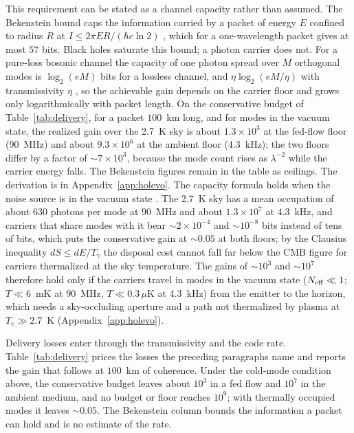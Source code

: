 \documentclass[11pt]{article}
\begin{document}
This requirement can be stated as a channel capacity rather than assumed. The Bekenstein bound caps the information carried by a packet of energy $E$ confined to radius $R$ at $I \leq 2\pi ER/(\hbar c \ln 2)$ \citep{Bekenstein1981}, which for a one-wavelength packet gives at most $57$ bits. Black holes saturate this bound; a photon carrier does not. For a pure-loss bosonic channel the capacity of one photon spread over $M$ orthogonal modes is $\log_2(eM)$ bits for a lossless channel, and $\eta\log_2(eM/\eta)$ with transmissivity $\eta$ \citep{Giovannetti2004}, so the achievable gain depends on the carrier floor and grows only logarithmically with packet length. On the conservative budget of Table~\ref{tab:delivery}, for a packet $100$~km long, and for modes in the vacuum state, the realized gain over the 2.7~K sky is about $1.3\times10^{3}$ at the fed-flow floor (90~MHz) and about $9.3\times10^{6}$ at the ambient floor (4.3~kHz); the two floors differ by a factor of $\sim 7\times10^{3}$, because the mode count rises as $\lambda^{-2}$ while the carrier energy falls. The Bekenstein figures remain in the table as ceilings. The derivation is in Appendix~\ref{app:holevo}. The capacity formula holds when the noise source is in the vacuum state \citep{Giovannetti2004}. The 2.7~K sky has a mean occupation of about $630$ photons per mode at $90$~MHz and about $1.3\times10^{7}$ at $4.3$~kHz, and carriers that share modes with it bear $\sim 2\times10^{-4}$ and $\sim 10^{-8}$ bits instead of tens of bits, which puts the conservative gain at $\sim 0.05$ at both floors; by the Clausius inequality $dS \leq dE/T_\gamma$ the disposal cost cannot fall far below the CMB figure for carriers thermalized at the sky temperature. The gains of $\sim 10^{3}$ and $\sim 10^{7}$ therefore hold only if the carriers travel in modes in the vacuum state ($N_{\rm eff}\ll1$; $T\ll6$~mK at 90~MHz, $T\ll0.3\,\mu$K at 4.3~kHz) from the emitter to the horizon, which needs a sky-occluding aperture and a path not thermalized by plasma at $T_e \gg 2.7$~K (Appendix~\ref{app:holevo}).

Delivery losses enter through the transmissivity and the code rate. Table~\ref{tab:delivery} prices the losses the preceding paragraphs name and reports the gain that follows at $100$~km of coherence. Under the cold-mode condition above, the conservative budget leaves about $10^{3}$ in a fed flow and $10^{7}$ in the ambient medium, and no budget or floor reaches $10^{9}$; with thermally occupied modes it leaves $\sim 0.05$. The Bekenstein column bounds the information a packet can hold and is no estimate of the rate.
\end{document}
